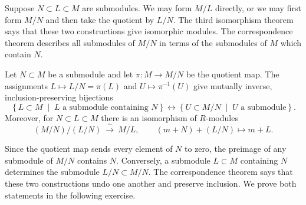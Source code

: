 \documentclass[Notebook.tex]{subfiles}
\begin{document}
\newpage

Suppose $N\subset L\subset M$ are submodules. We may form $M/L$ directly, or we may first form $M/N$ and then take the quotient by $L/N$. The third isomorphism theorem says that these two constructions give isomorphic modules. The correspondence theorem describes all submodules of $M/N$ in terms of the submodules of $M$ which contain $N$.

\begin{theorem}
	Let $N\subset M$ be a submodule and let $\pi:M\to M/N$ be the quotient map. The assignments $L\mapsto L/N=\pi(L)$ and $U\mapsto \pi^{-1}(U)$ give mutually inverse, inclusion-preserving bijections
	\[
	\left\{L\subset M \;\; \big| \;\; L\text{ a submodule containing }N\right\}
	\longleftrightarrow
	\left\{U\subset M/N \;\; \big| \;\; U\text{ a submodule}\right\}.
	\]
	Moreover, for $N\subset L\subset M$ there is an isomorphism of $R$-modules
	\[
	(M/N)/(L/N)\ \xrightarrow{\ \sim\ }\ M/L,\qquad
	(m+N)+(L/N)\longmapsto m+L.
	\]
\end{theorem}

Since the quotient map sends every element of $N$ to zero, the preimage of any submodule of $M/N$ contains $N$. Conversely, a submodule $L\subset M$ containing $N$ determines the submodule $L/N\subset M/N$. The correspondence theorem says that these two constructions undo one another and preserve inclusion. We prove both statements in the following exercise.

\hrulefill
\end{document}
